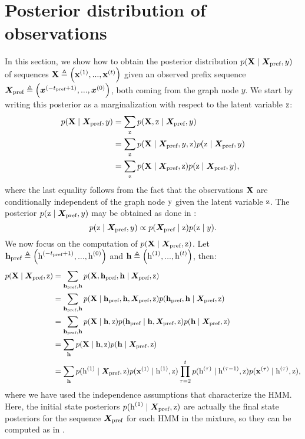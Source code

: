 \section{Posterior distribution of observations}
\label{sec:posterior_proof}
In this section, we show how to obtain the posterior distribution $p({\mathbf{X}} \mid {\bm{X}}_\text{pref}, y)$ of sequences ${\mathbf{X}} \triangleq \left({\mathbf{x}}^{(1)}, ...,{\mathbf{x}}^{(t)}\right)$ given an observed prefix sequence ${\bm{X}}_\text{pref} \triangleq \left({\bm{x}}^{(-t_\text{pref}+1)}, ...,{\bm{x}}^{(0)}\right)$, both coming from the graph node $y$. We start by writing this posterior as a marginalization with respect to the latent variable ${\textnormal{z}}$:
\begin{align}
\label{mhmm_posterior}
p({\mathbf{X}} \mid {\bm{X}}_\text{pref}, y) &= \sum_{{\textnormal{z}}} p({\mathbf{X}}, {\textnormal{z}} \mid {\bm{X}}_\text{pref}, y)\nonumber\\
&= \sum_{{\textnormal{z}}} p({\mathbf{X}} \mid {\bm{X}}_\text{pref}, y, {\textnormal{z}}) p({\textnormal{z}} \mid {\bm{X}}_\text{pref}, y) \nonumber\\
&= \sum_{{\textnormal{z}}} p({\mathbf{X}} \mid {\bm{X}}_\text{pref}, {\textnormal{z}}) p({\textnormal{z}} \mid {\bm{X}}_\text{pref}, y),
\end{align}
where the last equality follows from the fact that the observations ${\mathbf{X}}$ are conditionally independent of the graph node ${\textnormal{y}}$ given the latent variable ${\textnormal{z}}$. The posterior $p({\textnormal{z}} \mid {\bm{X}}_\text{pref}, y)$ may be obtained as done in :
\begin{equation}
p({\textnormal{z}} \mid {\bm{X}}_\text{pref}, y) \propto p({\bm{X}}_\text{pref} \mid {\textnormal{z}})p({\textnormal{z}} \mid y).
\end{equation}
We now focus on the computation of $p({\mathbf{X}} \mid {\bm{X}}_\text{pref}, {\textnormal{z}})$. Let ${\mathbf{h}}_\text{pref} \triangleq \left({\textnormal{h}}^{(-t_\text{pref}+1)}, ...,{\textnormal{h}}^{(0)}\right)$ and ${\mathbf{h}} \triangleq \left({\textnormal{h}}^{(1)}, ...,{\textnormal{h}}^{(t)}\right)$, then:
\begin{align}
p({\mathbf{X}} \mid {\bm{X}}_\text{pref}, {\textnormal{z}}) &= \sum_{{\mathbf{h}}_\text{pref}, {\mathbf{h}}} p({\mathbf{X}}, {\mathbf{h}}_\text{pref}, {\mathbf{h}} \mid {\bm{X}}_\text{pref}, {\textnormal{z}}) \nonumber\\
&= \sum_{{\mathbf{h}}_\text{pref}, {\mathbf{h}}} p({\mathbf{X}} \mid {\mathbf{h}}_\text{pref}, {\mathbf{h}}, {\bm{X}}_\text{pref}, {\textnormal{z}}) p({\mathbf{h}}_\text{pref}, {\mathbf{h}} \mid {\bm{X}}_\text{pref}, {\textnormal{z}}) \nonumber\\
&= \sum_{{\mathbf{h}}_\text{pref}, {\mathbf{h}}} p({\mathbf{X}} \mid {\mathbf{h}}, {\textnormal{z}}) p({\mathbf{h}}_\text{pref} \mid {\mathbf{h}}, {\bm{X}}_\text{pref}, {\textnormal{z}}) p({\mathbf{h}} \mid {\bm{X}}_\text{pref}, {\textnormal{z}}) \nonumber\\
&= \sum_{{\mathbf{h}}} p({\mathbf{X}} \mid {\mathbf{h}}, {\textnormal{z}}) p({\mathbf{h}} \mid {\bm{X}}_\text{pref}, {\textnormal{z}}) \nonumber\\
&= \sum_{{\mathbf{h}}} p({\textnormal{h}}^{(1)} \mid {\bm{X}}_\text{pref}, {\textnormal{z}}) p({\mathbf{x}}^{(1)} \mid {\textnormal{h}}^{(1)}, {\textnormal{z}}) \prod_{\tau=2}^{t} p({\textnormal{h}}^{(\tau)} \mid {\textnormal{h}}^{(\tau-1)}, {\textnormal{z}}) p({\mathbf{x}}^{(\tau)} \mid {\textnormal{h}}^{(\tau)}, {\textnormal{z}}),
\end{align}
where we have used the independence assumptions that characterize the HMM. Here, the initial state posteriors $p({\textnormal{h}}^{(1)} \mid {\bm{X}}_\text{pref}, {\textnormal{z}})$ are actually the final state posteriors for the sequence ${\bm{X}}_\text{pref}$ for each HMM in the mixture, so they can be computed as in .

